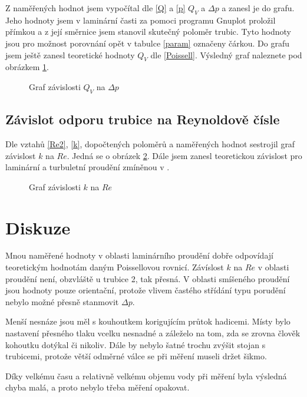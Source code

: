 \documentclass[a4paper,12pt]{article}
\begin{document}
Z naměřených hodnot jsem vypočítal dle \ref{Q} a \ref{p} $Q_V$ a $\Delta p$ a zanesl je do grafu. Jeho hodnoty jsem v laminární časti 
za pomoci programu Gnuplot proložil přímkou a z její směrnice jsem stanovil skutečný poloměr trubic. Tyto hodnoty jsou pro možnost 
porovnání opět v tabulce \ref{param} označeny čárkou. Do grafu jsem ještě zanesl teoretické hodnoty $Q_V$ dle \ref{Poissell}. Výsledný 
graf naleznete pod obrázkem \ref{graf1}. 

\begin{figure}
\begin{center}

\end{center}
\caption{Graf závislosti $Q_V$ na $\Delta p$}
\label{graf1}
\end{figure}

\subsection{Závislot odporu trubice na Reynoldově čísle}
\noindent
Dle vztahů \ref{Re2}, \ref{k}, dopočtených poloměrů a naměřených hodnot sestrojil graf závislost $k$ na $Re$. Jedná 
se o obrázek \ref{graf2}. Dále jsem zanesl teoretickou závislost pro laminární a turbuletní proudění zmíněnou v \cite{text}.

\begin{figure}
\begin{center}

\end{center}
\caption{Graf závislosti $k$ na $Re$}
\label{graf2}
\end{figure}

\section{Diskuze}
\noindent
Mnou naměřené hodnoty v oblasti laminárního proudění dobře odpovídají teoretickým hodnotám daným Poissellovou rovnicí. Závíslost $k$ na $Re$ 
v oblasti proudění není, obzvláště u trubice 2, tak přesná.  V oblasti smíšeného proudění jsou hodnoty pouze orientační, protože vlivem 
častého střídání typu porudění nebylo možné přesně stanmovit $\Delta p$.

Menší nesnáze jsou měl s kouhoutkem korigujícím průtok hadicemi. Místy bylo nastavení přesného tlaku vcelku nesnadné a záleželo na tom, 
zda se zrovna člověk kohoutku dotýkal či nikoliv. Dále by nebylo šatné trochu zvýšit stojan s trubicemi, protože větší odměrné válce se při 
měření museli držet šikmo.

Díky velkému času a relativně velkému objemu vody při měření byla výsledná chyba malá, a proto nebylo třeba měření opakovat.
\end{document}
